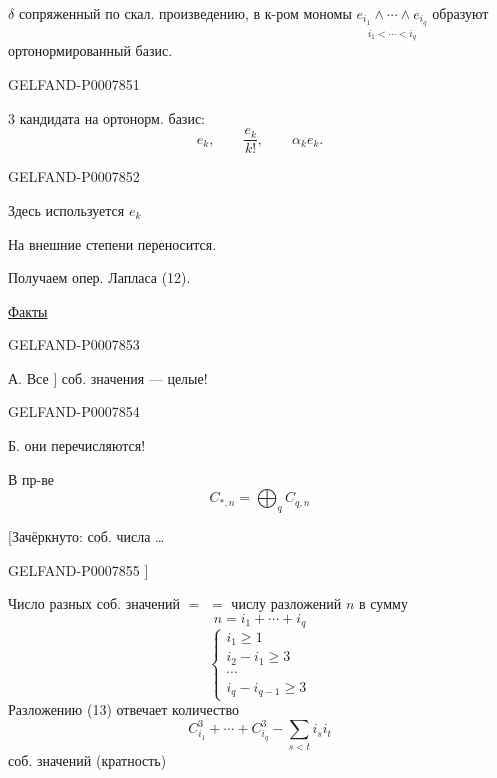 \(\delta\) сопряженный по скал. произведению, в к-ром мономы
\(\underset{i_1<\cdots<i_q}{e_{i_1}\wedge\cdots\wedge e_{i_q}}\)
образуют ортонормированный базис.


\begin{GelfandAdjacentEvidence}{GELFAND-P000785}{1}

3 кандидата на ортонорм. базис:
\[
e_k,\qquad\frac{e_k}{k!},\qquad\alpha_ke_k.
\]
\end{GelfandAdjacentEvidence}
\begin{GelfandAdjacentEvidence}{GELFAND-P000785}{2}

Здесь используется \(e_k\)

На внешние степени переносится.

Получаем опер. Лапласа (12).

\underline{Факты}
\end{GelfandAdjacentEvidence}
\begin{GelfandAdjacentEvidence}{GELFAND-P000785}{3}


А. Все \(\big]\) соб. значения --- целые!
\end{GelfandAdjacentEvidence}
\begin{GelfandAdjacentEvidence}{GELFAND-P000785}{4}


Б. они перечисляются!

В пр-ве
\[
C_{*,n}=\bigoplus_q C_{q,n}
\]

[Зачёркнуто: соб. числа …
\end{GelfandAdjacentEvidence}
\begin{GelfandAdjacentEvidence}{GELFAND-P000785}{5}
]

Число разных соб. значений \(=\)
\newline
\(=\) числу разложений \(n\) в сумму
\begin{equation}
n=i_1+\cdots+i_q\tag{13}
\end{equation}
\begin{equation}
\begin{cases}
i_1\geq1\\
i_2-i_1\geq3\\
\cdots\\
i_q-i_{q-1}\geq3
\end{cases}\tag{14}
\end{equation}
Разложению (13) отвечает количество
\begin{equation}
C_{i_1}^3+\cdots+C_{i_q}^3-\sum_{s<t}i_si_t\tag{15}
\end{equation}
соб. значений (кратность)
\end{GelfandAdjacentEvidence}
